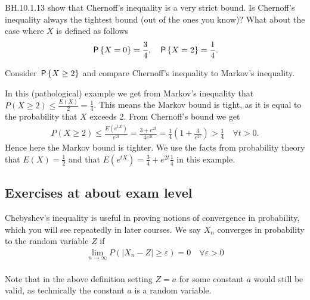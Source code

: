 \documentclass[assignments]{subfiles}
\begin{document}
\begin{exercise}
BH.10.1.13 show that Chernoff's inequality is a very strict bound.
Is Chernoff's inequality always the tightest bound (out of the ones you know)?
What about the case where $X$ is defined as follows
\begin{align*}
    &\P{X=0} = \frac{3}{4}, & \P{X=2} = \frac{1}{4}.
\end{align*}

\begin{hint}
  Consider $\P{X\geq2}$ and compare Chernoff's inequality to Markov's inequality.
\end{hint}

\begin{solution}
In this (pathological) example we get from Markov's inequality that $P(X\geq 2) \leq \frac{E(X)}{2}=\frac{1}{4}$. This means the Markov bound is tight, as it is equal to the probability that $X$ exceeds 2. From Chernoff's bound we get
\begin{align*}
    P(X\geq 2)\leq \frac{E(e^{t  X})}{e^{2t}} = \frac{3+e^{2t}}{4 e^{2t}} = \frac{1}{4}\left(1+\frac{3}{e^{2t}}\right) > \frac{1}{4}\quad\forall t>0.
\end{align*} Hence here the Markov bound is tighter. We use the facts from probability theory that $E(X)=\frac12$ and that $E(e^{t X})=\frac34+e^{2 t}\frac14$ in this example.
\end{solution}
\end{exercise}



\subsection{Exercises at about exam level}

Chebyshev's inequality is useful in proving notions of convergence in probability, which you will see repeatedly in later courses. We say $X_n$ converges in probability to the random variable $Z$ if
\begin{align*}
    \lim_{n\rightarrow\infty}P(\left|X_n-Z\right| \geq \varepsilon) = 0\quad\forall\varepsilon>0
\end{align*}\\
Note that in the above definition setting $Z=a$ for some constant $a$ would still be valid, as technically the constant $a$ is a random variable.
\end{document}

